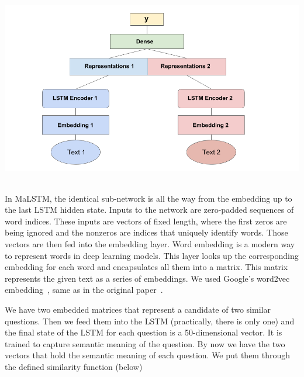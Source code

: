 \documentclass[runningheads]{llncs}
\begin{document}
	\begin{minipage}{\linewidth}
		\begin{center}
			\includegraphics[width=\linewidth]{siamese_image.png}
			\label{fig:Siamese Model Architectture}~\cite{ref_url22}
		\end{center}
	\end{minipage}
	\afterpage{\clearpage}
	
	In MaLSTM, the identical sub-network is all the way from the embedding up to the last LSTM hidden state. Inputs to the network are zero-padded sequences of word indices. These inputs are vectors of fixed length, where the first zeros are being ignored and the nonzeros are indices that uniquely identify words. Those vectors are then fed into the embedding layer. Word embedding is a modern way to represent words in deep learning models. This layer looks up the corresponding embedding for each word and encapsulates all them into a matrix. This matrix represents the given text as a series of embeddings. We used Google’s word2vec embedding~\cite{ref_url23}, same as in the original paper~\cite{ref_url24}.
	
	We have two embedded matrices that represent a candidate of two similar questions. Then we feed them into the LSTM (practically, there is only one) and the final state of the LSTM for each question is a 50-dimensional vector. It is trained to capture semantic meaning of the question. By now we have the two vectors that hold the semantic meaning of each question. We put them through the defined similarity function (below)
	
	\begin{minipage}{\linewidth}
		\begin{center}
		\end{center}
	\end{minipage}
	\afterpage{\clearpage}
	
\end{document}
